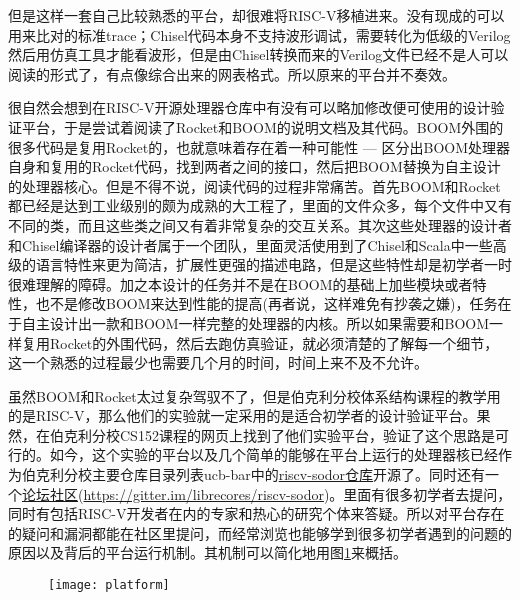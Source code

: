 	但是这样一套自己比较熟悉的平台，却很难将RISC-V移植进来。没有现成的可以用来比对的标准trace；Chisel代码本身不支持波形调试，需要转化为低级的Verilog然后用仿真工具才能看波形，但是由Chisel转换而来的Verilog文件已经不是人可以阅读的形式了，有点像综合出来的网表格式。所以原来的平台并不奏效。
	
	很自然会想到在RISC-V开源处理器仓库中有没有可以略加修改便可使用的设计验证平台，于是尝试着阅读了Rocket和BOOM的说明文档及其代码。BOOM外围的很多代码是复用Rocket的，也就意味着存在着一种可能性 --- 区分出BOOM处理器自身和复用的Rocket代码，找到两者之间的接口，然后把BOOM替换为自主设计的处理器核心。但是不得不说，阅读代码的过程非常痛苦。首先BOOM和Rocket都已经是达到工业级别的颇为成熟的大工程了，里面的文件众多，每个文件中又有不同的类，而且这些类之间又有着非常复杂的交互关系。其次这些处理器的设计者和Chisel编译器的设计者属于一个团队，里面灵活使用到了Chisel和Scala中一些高级的语言特性来更为简洁，扩展性更强的描述电路，但是这些特性却是初学者一时很难理解的障碍。加之本设计的任务并不是在BOOM的基础上加些模块或者特性，也不是修改BOOM来达到性能的提高(再者说，这样难免有抄袭之嫌)，任务在于自主设计出一款和BOOM一样完整的处理器的内核。所以如果需要和BOOM一样复用Rocket的外围代码，然后去跑仿真验证，就必须清楚的了解每一个细节，这一个熟悉的过程最少也需要几个月的时间，时间上来不及不允许。
	
	虽然BOOM和Rocket太过复杂驾驭不了，但是伯克利分校体系结构课程的教学用的是RISC-V，那么他们的实验就一定采用的是适合初学者的设计验证平台。果然，在伯克利分校CS152课程的网页上找到了他们实验平台，验证了这个思路是可行的。如今，这个实验的平台以及几个简单的能够在平台上运行的处理器核已经作为伯克利分校主要仓库目录列表ucb-bar中的\href{https://github.com/ucb-bar/riscv-sodor}{riscv-sodor仓库}开源了。同时还有一个\href{https://gitter.im/librecores/riscv-sodor}{论坛社区}(\url{https://gitter.im/librecores/riscv-sodor})。里面有很多初学者去提问，同时有包括RISC-V开发者在内的专家和热心的研究个体来答疑。所以对平台存在的疑问和漏洞都能在社区里提问，而经常浏览也能够学到很多初学者遇到的问题的原因以及背后的平台运行机制。其机制可以简化地用图\ref{fig:platform}来概括。
	\begin{figure}[!htbp]
		\centering
		\texttt{[image: platform]}
		\label{fig:platform}
	\end{figure}
	
